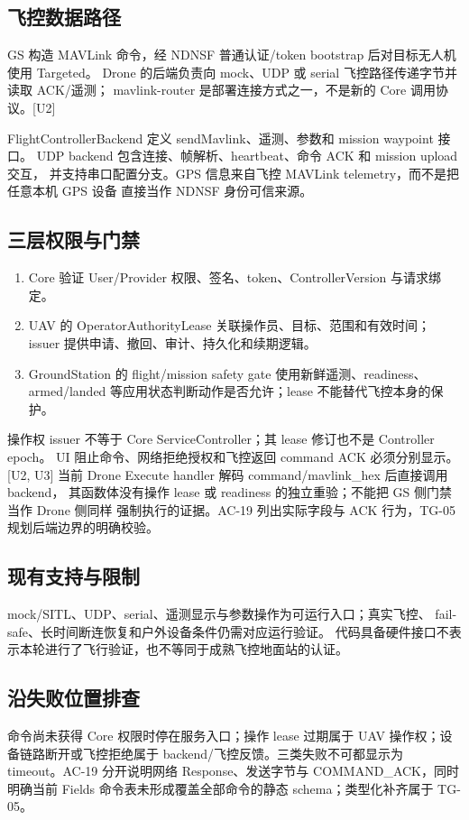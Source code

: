 \subsection{飞控数据路径}
GS 构造 MAVLink 命令，经 NDNSF 普通认证/token bootstrap 后对目标无人机使用 Targeted。
Drone 的后端负责向 mock、UDP 或 serial 飞控路径传递字节并读取 ACK/遥测；
mavlink-router 是部署连接方式之一，不是新的 Core 调用协议。[U2]

FlightControllerBackend 定义 sendMavlink、遥测、参数和 mission waypoint 接口。
UDP backend 包含连接、帧解析、heartbeat、命令 ACK 和 mission upload 交互，
并支持串口配置分支。GPS 信息来自飞控 MAVLink telemetry，而不是把任意本机 GPS 设备
直接当作 NDNSF 身份可信来源。

\subsection{三层权限与门禁}
\begin{enumerate}
\item Core 验证 User/Provider 权限、签名、token、ControllerVersion 与请求绑定。
\item UAV 的 OperatorAuthorityLease 关联操作员、目标、范围和有效时间；
issuer 提供申请、撤回、审计、持久化和续期逻辑。
\item GroundStation 的 flight/mission safety gate 使用新鲜遥测、readiness、
armed/landed 等应用状态判断动作是否允许；lease 不能替代飞控本身的保护。
\end{enumerate}
操作权 issuer 不等于 Core ServiceController；其 lease 修订也不是 Controller epoch。
UI 阻止命令、网络拒绝授权和飞控返回 command ACK 必须分别显示。[U2, U3]
当前 Drone Execute handler 解码 command/mavlink\_hex 后直接调用 backend，
其函数体没有操作 lease 或 readiness 的独立重验；不能把 GS 侧门禁当作 Drone 侧同样
强制执行的证据。AC-19 列出实际字段与 ACK 行为，TG-05 规划后端边界的明确校验。

\subsection{现有支持与限制}
mock/SITL、UDP、serial、遥测显示与参数操作为可运行入口；真实飞控、
fail-safe、长时间断连恢复和户外设备条件仍需对应运行验证。
代码具备硬件接口不表示本轮进行了飞行验证，也不等同于成熟飞控地面站的认证。


\subsection{沿失败位置排查}
命令尚未获得 Core 权限时停在服务入口；操作 lease 过期属于 UAV 操作权；设备链路断开或飞控拒绝属于 backend/飞控反馈。三类失败不可都显示为 timeout。AC-19 分开说明网络 Response、发送字节与 COMMAND\_ACK，同时明确当前 Fields 命令表未形成覆盖全部命令的静态 schema；类型化补齐属于 TG-05。

